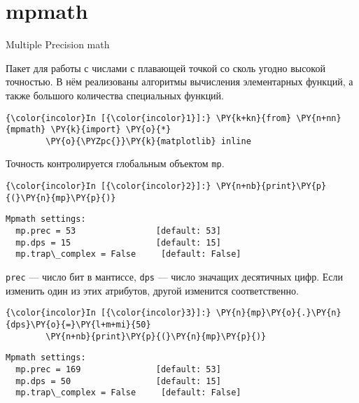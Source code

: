 \section{mpmath}
\label{mpmath}

Multiple Precision math

Пакет для работы с числами с плавающей точкой со сколь угодно высокой
точностью. В нём реализованы алгоритмы вычисления элементарных функций,
а также большого количества специальных функций.

    \begin{Verbatim}[commandchars=\\\{\}]
{\color{incolor}In [{\color{incolor}1}]:} \PY{k+kn}{from} \PY{n+nn}{mpmath} \PY{k}{import} \PY{o}{*}
        \PY{o}{\PYZpc{}}\PY{k}{matplotlib} inline
\end{Verbatim}

    Точность контролируется глобальным объектом \texttt{mp}.

    \begin{Verbatim}[commandchars=\\\{\}]
{\color{incolor}In [{\color{incolor}2}]:} \PY{n+nb}{print}\PY{p}{(}\PY{n}{mp}\PY{p}{)}
\end{Verbatim}

    \begin{Verbatim}[commandchars=\\\{\}]
Mpmath settings:
  mp.prec = 53                [default: 53]
  mp.dps = 15                 [default: 15]
  mp.trap\_complex = False     [default: False]

    \end{Verbatim}

    \texttt{prec} --- число бит в мантиссе, \texttt{dps} --- число значащих
десятичных цифр. Если изменить один из этих атрибутов, другой изменится
соответственно.

    \begin{Verbatim}[commandchars=\\\{\}]
{\color{incolor}In [{\color{incolor}3}]:} \PY{n}{mp}\PY{o}{.}\PY{n}{dps}\PY{o}{=}\PY{l+m+mi}{50}
        \PY{n+nb}{print}\PY{p}{(}\PY{n}{mp}\PY{p}{)}
\end{Verbatim}

    \begin{Verbatim}[commandchars=\\\{\}]
Mpmath settings:
  mp.prec = 169               [default: 53]
  mp.dps = 50                 [default: 15]
  mp.trap\_complex = False     [default: False]

    \end{Verbatim}

